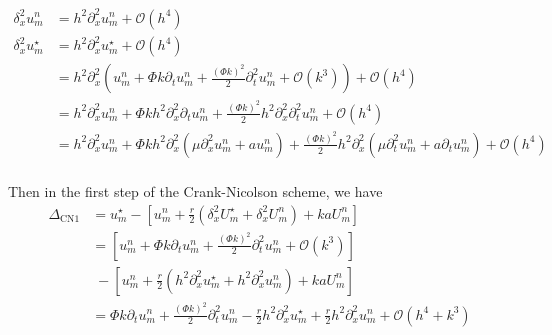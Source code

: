 \begin{align*}
  \delta_x^2 u_m^n &= h^2 \partial_x^2 u_m^n + \mathcal{O}(h^4) \\
  \delta_x^2 u_m^\star &= h^2 \partial_x^2 u_m^\star + \mathcal{O}(h^4)\\
  &= h^2 \partial_x^2 \left( u_m^n + \Phi k \partial_t u_m^n + \frac{(\Phi k)^2}{2} \partial_t^2 u_m^n + \mathcal{O}(k^3) \right) + \mathcal{O}(h^4) \\
  &= h^2 \partial_x^2 u_m^n + \Phi k h^2 \partial_x^2 \partial_t u_m^n + \frac{(\Phi k)^2}{2} h^2 \partial_x^2 \partial_t^2 u_m^n + \mathcal{O}(h^4) \\
  &= h^2 \partial_x^2 u_m^n + \Phi k h^2 \partial_x^2 \left( \mu \partial_x^2 u_m^n + a u_m^n \right) + \frac{(\Phi k)^2}{2} h^2 \partial_x^2 \left( \mu \partial_t^2 u_m^n + a \partial_t u_m^n \right) + \mathcal{O}(h^4) \\
\end{align*}

Then in the first step of the Crank-Nicolson scheme, we have
\begin{align*}
  \Delta_{\text{CN1}} &= u_m^\star - \left[u_m^n + \frac{r}{2} \left( \delta_x^2 U_m^\star + \delta_x^2 U_m^n \right) + k a U_m^n\right]\\
  &= \left[ u_m^n + \Phi k \partial_t u_m^n + \frac{(\Phi k)^2}{2} \partial_t^2 u_m^n + \mathcal{O}(k^3) \right] \\
  &\; - \left[ u_m^n + \frac{r}{2} \left( h^2 \partial_x^2 u_m^\star + h^2 \partial_x^2 u_m^n \right) + k a U_m^n \right] \\
  &= \Phi k \partial_t u_m^n + \frac{(\Phi k)^2}{2} \partial_t^2 u_m^n - \frac{r}{2} h^2 \partial_x^2 u_m^\star + \frac{r}{2} h^2 \partial_x^2 u_m^n + \mathcal{O}(h^4 + k^3) \\
\end{align*}
